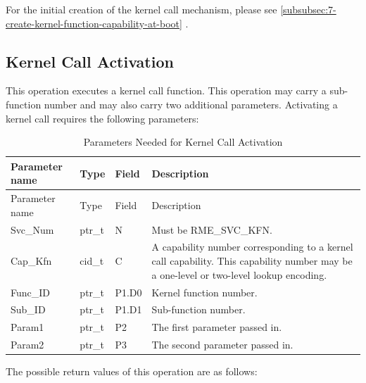 For the initial creation of the kernel call mechanism, please see \ref{subsubsec:7-create-kernel-function-capability-at-boot}
.

\subsection{Kernel Call Activation}\label{subsec:6-activate-kernel-call}

This operation executes a kernel call function. This operation may carry a sub-function number and may also carry two additional parameters. Activating a kernel call requires the following parameters:

\begin{xltabular}{\textwidth}{@{}>{\hsize\raggedright\arraybackslash}X>{\hsize\raggedright\arraybackslash}X>{\hsize\raggedright\arraybackslash}X>{\hsize\raggedright\arraybackslash}X@{}}
\caption{Parameters Needed for Kernel Call Activation}\label{tab:6-3-kernel-call-activation-parameters}\\
\toprule
Parameter name & Type & Field & Description\tabularnewline
\endfirsthead
\toprule
Parameter name & Type & Field & Description\tabularnewline
\midrule
\endhead
\bottomrule
\endlastfoot
Svc\_Num & ptr\_t & N & Must be RME\_SVC\_KFN.\tabularnewline
Cap\_Kfn & cid\_t & C &
A capability number corresponding to a kernel call capability. This capability number may be a one-level or two-level lookup encoding.\tabularnewline
Func\_ID & ptr\_t & P1.D0 & Kernel function number.\tabularnewline
Sub\_ID & ptr\_t & P1.D1 & Sub-function number.\tabularnewline
Param1 & ptr\_t & P2 & The first parameter passed in.\tabularnewline
Param2 & ptr\_t & P3 & The second parameter passed in.\tabularnewline
\end{xltabular}
\nopagebreak[4]

The possible return values of this operation are as follows:

